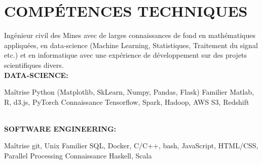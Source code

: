 \documentclass[]{cv-style}          %
\begin{document}
\section{COMPÉTENCES TECHNIQUES}
\vspace{-0.3cm}
%
Ingénieur civil des Mines avec de larges connaissances de fond en mathématiques appliquées, en data-science (Machine Learning, Statistiques, Traitement du signal etc.) et en informatique avec une expérience de développement sur des projets scientifiques divers. \\[0.1cm]
\textbf{DATA-SCIENCE:} \\[0.1cm]
\begin{entrylist}
\entry
{Maîtrise}
{
{\normalfont Python (Matplotlib, SkLearn, Numpy, Pandas, Flask)}}{}{\vspace{-0.6cm}}
\entry
{Familier}
{
{\normalfont Matlab, R, d3.js, PyTorch}}{}{\vspace{-0.5cm}}
\entry
{Connaissance}
{
{\normalfont Tensorflow, Spark, Hadoop, AWS S3, Redshift}}{}{}
\end{entrylist}
\vspace{-0.5cm}\\
\textbf{SOFTWARE ENGINEERING:} \\[0.1cm]
\begin{entrylist}
\entry
{Maîtrise}
{
{\normalfont git, Unix}}{}{\vspace{-0.6cm}}
\entry
{Familier}
{
{\normalfont SQL, Docker, C/C++, bash, JavaScript, HTML/CSS, Parallel Processing}}{}{\vspace{-0.5cm}}
\entry
{Connaissance}
{
{\normalfont Haskell, Scala}}{}{\vspace{-0.5cm}}
\end{entrylist}
%
%
%
\end{document}
